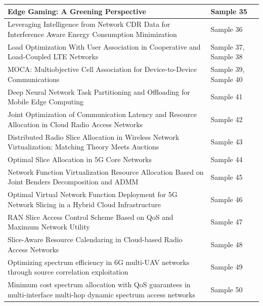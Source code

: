 \documentclass[11pt]{article}
\begin{document}
\begin{table}[htbp]
{\begin{tabular}{|>{\raggedright\arraybackslash}m{13cm}|>{\raggedright\arraybackslash}m{3.5cm}|}
\hline
Edge Gaming: A Greening Perspective  & Sample 35\\
\hline
Leveraging Intelligence from Network CDR
Data for Interference Aware Energy
Consumption Minimization  & Sample 36\\
\hline
Load Optimization With User Association
in Cooperative and Load-Coupled
LTE Networks  & Sample 37, Sample 38\\
\hline
MOCA: Multiobjective Cell Association for Device-to-Device Communications  & Sample 39, Sample 40\\
\hline
Deep Neural Network Task Partitioning and
Offloading for Mobile Edge Computing  & Sample 41\\
\hline
Joint Optimization of Communication Latency and
Resource Allocation in Cloud Radio Access Networks  & Sample 42\\
\hline
Distributed Radio Slice Allocation in Wireless
Network Virtualization: Matching
Theory Meets Auctions  & Sample 43\\
\hline
Optimal Slice Allocation in 5G Core Networks  & Sample 44\\
\hline
Network Function Virtualization Resource Allocation
Based on Joint Benders Decomposition and ADMM  & Sample 45\\
\hline
Optimal Virtual Network Function Deployment
for 5G Network Slicing in a Hybrid
Cloud Infrastructure  & Sample 46\\
\hline
RAN Slice Access Control Scheme Based on
QoS and Maximum Network Utility  & Sample 47\\
\hline
Slice-Aware Resource Calendaring in Cloud-based Radio Access Networks  & Sample 48\\
\hline
Optimizing spectrum efficiency in 6G
multi-UAV networks through source correlation
exploitation  & Sample 49\\
\hline
Minimum cost spectrum allocation with QoS guarantees in multi-interface multi-hop dynamic spectrum access networks  & Sample 50\\
\hline
\end{tabular}
}
\end{table}
\end{document}

